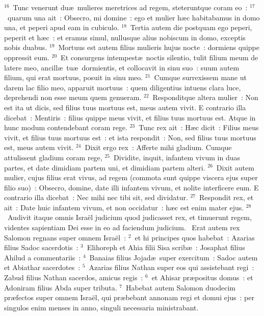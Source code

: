 ${}^{16}$~Tunc venerunt du\ae\ mulieres meretrices ad regem, steteruntque coram eo~:
${}^{17}$~quarum una ait~: Obsecro, mi domine~: ego et mulier h\ae c habitabamus in domo una, et peperi apud eam in cubiculo.
${}^{18}$~Tertia autem die postquam ego peperi, peperit et h\ae c~: et eramus simul, nullusque alius nobiscum in domo, exceptis nobis duabus.
${}^{19}$~Mortuus est autem filius mulieris hujus nocte~: dormiens quippe oppressit eum.
${}^{20}$~Et consurgens intempest\ae\ noctis silentio, tulit filium meum de latere meo, ancill\ae\ tu\ae\ dormientis, et collocavit in sinu suo~: suum autem filium, qui erat mortuus, posuit in sinu meo.
${}^{21}$~Cumque surrexissem mane ut darem lac filio meo, apparuit mortuus~: quem diligentius intuens clara luce, deprehendi non esse meum quem genueram.
${}^{22}$~Responditque altera mulier~: Non est ita ut dicis, sed filius tuus mortuus est, meus autem vivit. E contrario illa dicebat~: Mentiris~: filius quippe meus vivit, et filius tuus mortuus est. Atque in hunc modum contendebant coram rege.
${}^{23}$~Tunc rex ait~: H\ae c dicit~: Filius meus vivit, et filius tuus mortuus est~: et ista respondit~: Non, sed filius tuus mortuus est, meus autem vivit.
${}^{24}$~Dixit ergo rex~: Afferte mihi gladium. Cumque attulissent gladium coram rege,
${}^{25}$~Dividite, inquit, infantem vivum in duas partes, et date dimidiam partem uni, et dimidiam partem alteri.
${}^{26}$~Dixit autem mulier, cujus filius erat vivus, ad regem (commota sunt quippe viscera ejus super filio suo)~: Obsecro, domine, date illi infantem vivum, et nolite interficere eum. E contrario illa dicebat~: Nec mihi nec tibi sit, sed dividatur.
${}^{27}$~Respondit rex, et ait~: Date huic infantem vivum, et non occidatur~: h\ae c est enim mater ejus.
${}^{28}$~Audivit itaque omnis Isra\"el judicium quod judicasset rex, et timuerunt regem, videntes sapientiam Dei esse in eo ad faciendum judicium.
~Erat autem rex Salomon regnans super omnem Isra\"el~:
${}^{2}$~et hi principes quos habebat~: Azarias filius Sadoc sacerdotis~:
${}^{3}$~Elihoreph et Ahia filii Sisa scrib\ae~: Josaphat filius Ahilud a commentariis~:
${}^{4}$~Banaias filius Jojad\ae\ super exercitum~: Sadoc autem et Abiathar sacerdotes~:
${}^{5}$~Azarias filius Nathan super eos qui assistebant regi~: Zabud filius Nathan sacerdos, amicus regis~:
${}^{6}$~et Ahisar pr\ae positus domus~: et Adoniram filius Abda super tributa.
${}^{7}$~Habebat autem Salomon duodecim pr\ae fectos super omnem Isra\"el, qui pr\ae bebant annonam regi et domui ejus~: per singulos enim menses in anno, singuli necessaria ministrabant.
